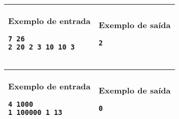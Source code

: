 \begin{table}[!h]
\centering
\begin{tabular}{|l|l|}
\hline
\begin{minipage}[t]{3in}
\textbf{Exemplo de entrada}
\begin{verbatim}
7 26
2 20 2 3 10 10 3
\end{verbatim}
\vspace{1mm}
\end{minipage}
&
\begin{minipage}[t]{3in}
\textbf{Exemplo de saída}
\begin{verbatim}
2
\end{verbatim}
\vspace{1mm}
\end{minipage} \\
\hline
\end{tabular}
\end{table}

\begin{table}[!h]
\centering
\begin{tabular}{|l|l|}
\hline
\begin{minipage}[t]{3in}
\textbf{Exemplo de entrada}
\begin{verbatim}
4 1000
1 100000 1 13
\end{verbatim}
\vspace{1mm}
\end{minipage}
&
\begin{minipage}[t]{3in}
\textbf{Exemplo de saída}
\begin{verbatim}
0
\end{verbatim}
\vspace{1mm}
\end{minipage} \\
\hline
\end{tabular}
\end{table}
